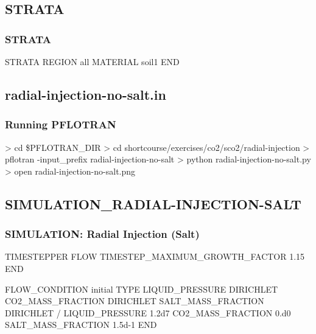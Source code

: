 \documentclass{beamer}
\newcommand\greencomment[1]{{{\color{green} #1}}}
\begin{document}

\subsection{STRATA}

\begin{frame}[fragile]\frametitle{STRATA}

\begin{semiverbatim}

STRATA
  REGION all
  MATERIAL soil1
END

\end{semiverbatim}

\end{frame}

\subsection{radial-injection-no-salt.in}

\begin{frame}[fragile]\frametitle{Running PFLOTRAN}

\begin{semiverbatim}

> cd \$PFLOTRAN_DIR
> cd shortcourse/exercises/co2/sco2/radial-injection
> pflotran -input_prefix radial-injection-no-salt
> python radial-injection-no-salt.py
> open radial-injection-no-salt.png
\end{semiverbatim}

\end{frame}

\subsection{SIMULATION\_RADIAL-INJECTION-SALT}

\begin{frame}\frametitle{SIMULATION: Radial Injection (Salt)}

\begin{semiverbatim}





  TIMESTEPPER FLOW
    TIMESTEP_MAXIMUM_GROWTH_FACTOR 1.15
  END

\newpage
FLOW_CONDITION initial
  TYPE
    LIQUID_PRESSURE DIRICHLET
    CO2_MASS_FRACTION DIRICHLET
    SALT_MASS_FRACTION DIRICHLET
  /
  LIQUID_PRESSURE 1.2d7
  CO2_MASS_FRACTION 0.d0
  \greencomment{SALT_MASS_FRACTION 1.5d-1}
END
\end{semiverbatim}

\end{frame}
\end{document}
